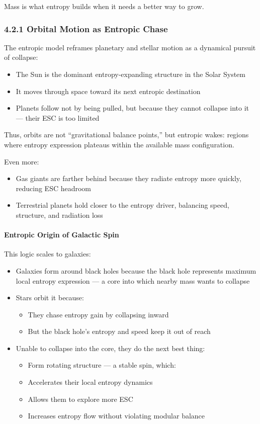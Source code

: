 \documentclass[12pt]{article}
\begin{document}
Mass is what entropy builds when it needs a better way to grow.

\subsubsection*{4.2.1 Orbital Motion as Entropic Chase}

The entropic model reframes planetary and stellar motion as a dynamical pursuit of collapse:
\begin{itemize}
    \item The Sun is the dominant entropy-expanding structure in the Solar System
    \item It moves through space toward its next entropic destination
    \item Planets follow not by being pulled, but because they cannot collapse into it — their ESC is too limited
\end{itemize}

Thus, orbits are not ``gravitational balance points,'' but entropic wakes: regions where entropy expression plateaus within the available mass configuration.

Even more:
\begin{itemize}
    \item Gas giants are farther behind because they radiate entropy more quickly, reducing ESC headroom
    \item Terrestrial planets hold closer to the entropy driver, balancing speed, structure, and radiation loss
\end{itemize}

\paragraph{\textbf{Entropic Origin of Galactic Spin}}

This logic scales to galaxies:
\begin{itemize}
    \item Galaxies form around black holes because the black hole represents maximum local entropy expression — a core into which nearby mass wants to collapse
    \item Stars orbit it because:
    \begin{itemize}
        \item They chase entropy gain by collapsing inward
        \item But the black hole’s entropy and speed keep it out of reach
    \end{itemize}
    \item Unable to collapse into the core, they do the next best thing:
    \begin{itemize}
        \item Form rotating structure — a stable spin, which:
        \item Accelerates their local entropy dynamics
        \item Allows them to explore more ESC
        \item Increases entropy flow without violating modular balance
    \end{itemize}
\end{itemize}
\end{document}
